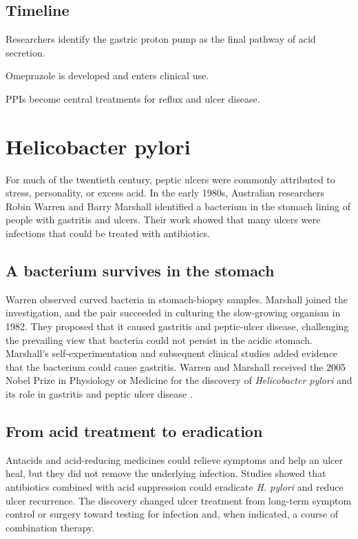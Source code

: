 \documentclass[12pt,oneside]{book}
\begin{document}
\section*{Timeline}
\begin{description}[leftmargin=2.3cm,style=nextline]
  \item[1970s] Researchers identify the gastric proton pump as the final pathway of acid secretion.
  \item[1980s] Omeprazole is developed and enters clinical use.
  \item[1990s onward] PPIs become central treatments for reflux and ulcer disease.
\end{description}
\chapter[Helicobacter pylori]{Helicobacter pylori}

For much of the twentieth century, peptic ulcers were commonly attributed to
stress, personality, or excess acid. In the early 1980s, Australian
researchers Robin Warren and Barry Marshall identified a bacterium in the
stomach lining of people with gastritis and ulcers. Their work showed that
many ulcers were infections that could be treated with antibiotics.

\section{A bacterium survives in the stomach}
Warren observed curved bacteria in stomach-biopsy samples. Marshall joined
the investigation, and the pair succeeded in culturing the slow-growing
organism in 1982. They proposed that it caused gastritis and peptic-ulcer
disease, challenging the prevailing view that bacteria could not persist in
the acidic stomach. Marshall's self-experimentation and subsequent clinical
studies added evidence that the bacterium could cause gastritis. Warren and
Marshall received the 2005 Nobel Prize in Physiology or Medicine for the
discovery of \emph{Helicobacter pylori} and its role in gastritis and peptic
ulcer disease \cite{nobelHPylori,ncbiHPyloriHistory}.

\section{From acid treatment to eradication}
Antacids and acid-reducing medicines could relieve symptoms and help an
ulcer heal, but they did not remove the underlying infection. Studies showed
that antibiotics combined with acid suppression could eradicate \emph{H.
pylori} and reduce ulcer recurrence. The discovery changed ulcer treatment
from long-term symptom control or surgery toward testing for infection and,
when indicated, a course of combination therapy.
\end{document}
